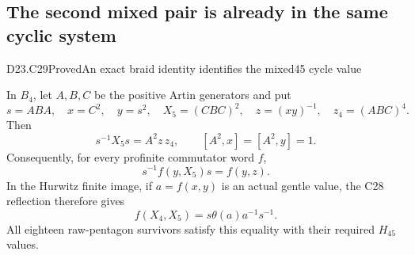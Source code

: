 \subsection{The second mixed pair is already in the same cyclic system}

\begin{statement}{D23.C29}{Proved}{An exact braid identity identifies the mixed45 cycle value}
\end{statement}
In $B_4$, let $A,B,C$ be the positive Artin generators and put
\[
 s=ABA,\quad x=C^2,\quad y=s^2,\quad
 X_5=(CBC)^2,\quad z=(xy)^{-1},\quad z_4=(ABC)^4.
\]
Then
\[
              s^{-1}X_5s=A^2z\,z_4,\qquad
              [A^2,x]=[A^2,y]=1.                          \tag{D23.C29.1}
\]
Consequently, for every profinite commutator word $f$,
\[
                   s^{-1}f(y,X_5)s=f(y,z).                \tag{D23.C29.2}
\]
In the Hurwitz finite image, if $a=f(x,y)$ is an actual
gentle value, the C28 reflection therefore gives
\[
                   f(X_4,X_5)=s\theta(a)a^{-1}s^{-1}.
                                                               \tag{D23.C29.3}
\]
All eighteen raw-pentagon survivors satisfy this equality
with their required $H_{45}$ values.

